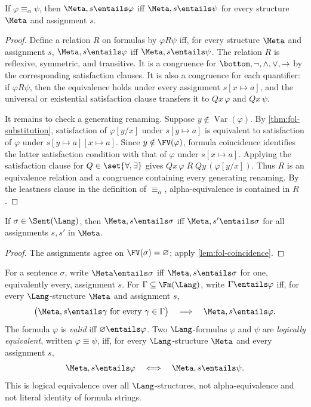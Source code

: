 \begin{corollary}
\label{cor:alpha-invariance}
If \(\varphi\equiv_\alpha\psi\), then
\(\Meta,s\entails\varphi\) iff \(\Meta,s\entails\psi\) for every structure
\(\Meta\) and assignment \(s\).
\end{corollary}
\begin{proof}
Define a relation \(R\) on formulas by \(\varphi R\psi\) iff, for every
structure \(\Meta\) and assignment \(s\),
\(\Meta,s\entails\varphi\) iff \(\Meta,s\entails\psi\).  The relation
\(R\) is reflexive, symmetric, and transitive.  It is a congruence for
\(\bottom,\neg,\land,\lor,\to\) by the corresponding satisfaction clauses.
It is also a congruence for each quantifier: if \(\varphi R\psi\), then the
equivalence holds under every assignment \(s[x\mapsto a]\), and the
universal or existential satisfaction clause transfers it to
\(Qx\,\varphi\) and \(Qx\,\psi\).

It remains to check a generating renaming.  Suppose
\(y\notin\operatorname{Var}(\varphi)\).  By
\cref{thm:fol-substitution}, satisfaction of \(\varphi[y/x]\) under
\(s[y\mapsto a]\) is equivalent to satisfaction of \(\varphi\) under
\(s[y\mapsto a][x\mapsto a]\).  Since \(y\notin\FV(\varphi)\), formula
coincidence identifies the latter satisfaction condition with that of
\(\varphi\) under \(s[x\mapsto a]\).  Applying the satisfaction clause for
\(Q\in\set{\forall,\exists}\) gives
\(Qx\,\varphi\;R\;Qy\,(\varphi[y/x])\).  Thus \(R\) is an equivalence
relation and a congruence containing every generating renaming.  By the
leastness clause in the definition of \(\equiv_\alpha\), alpha-equivalence is
contained in \(R\).
\end{proof}

\begin{corollary}
If \(\sigma\in\Sent(\Lang)\), then
\(\Meta,s\entails\sigma\) iff \(\Meta,s'\entails\sigma\) for all assignments
\(s,s'\) in \(\Meta\).
\end{corollary}
\begin{proof}
The assignments agree on \(\FV(\sigma)=\varnothing\); apply
\cref{lem:fol-coincidence}.
\end{proof}

\begin{definition}
For a sentence \(\sigma\), write \(\Meta\entails\sigma\) iff
\(\Meta,s\entails\sigma\) for one, equivalently every, assignment \(s\).
For \(\Gamma\subseteq\Fm(\Lang)\), write
\(\Gamma\entails\varphi\) iff, for every \(\Lang\)-structure \(\Meta\) and
assignment \(s\),
\[
 \bigl(\Meta,s\entails\gamma\text{ for every }\gamma\in\Gamma\bigr)
 \quad\Longrightarrow\quad
 \Meta,s\entails\varphi.
\]
The formula \(\varphi\) is \emph{valid} iff
\(\varnothing\entails\varphi\).
Two \(\Lang\)-formulas \(\varphi\) and \(\psi\) are \emph{logically
equivalent}, written \(\varphi\equiv\psi\), iff, for every
\(\Lang\)-structure \(\Meta\) and every assignment
\(s\),
\[
  \Meta,s\entails\varphi
  \quad\Longleftrightarrow\quad
  \Meta,s\entails\psi.
\]
This is logical equivalence over all \(\Lang\)-structures, not
alpha-equivalence and not literal identity of formula strings.
\end{definition}


